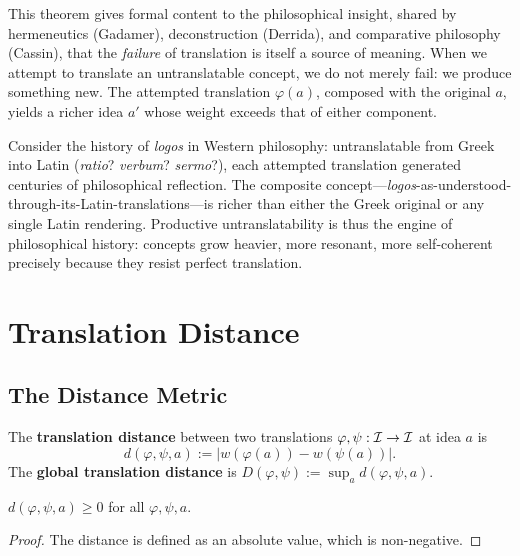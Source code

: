 \begin{interpretation}
\label{interp:generativity-failure}
This theorem gives formal content to the philosophical insight, shared by hermeneutics (Gadamer), deconstruction (Derrida), and comparative philosophy (Cassin), that the \emph{failure} of translation is itself a source of meaning.  When we attempt to translate an untranslatable concept, we do not merely fail: we produce something new.  The attempted translation $\varphi(a)$, composed with the original $a$, yields a richer idea $a'$ whose weight exceeds that of either component.

Consider the history of \emph{logos} in Western philosophy: untranslatable from Greek into Latin (\emph{ratio}? \emph{verbum}? \emph{sermo}?), each attempted translation generated centuries of philosophical reflection.  The composite concept---\emph{logos}-as-understood-through-its-Latin-translations---is richer than either the Greek original or any single Latin rendering.  Productive untranslatability is thus the engine of philosophical history: concepts grow heavier, more resonant, more self-coherent precisely because they resist perfect translation.
\end{interpretation}

\section{Translation Distance}
\label{sec:untranslatable:distance}

\subsection{The Distance Metric}

\begin{definition}
\label{def:translation-distance}
The \textbf{translation distance} between two translations
$\varphi, \psi : \mathcal{I} \to \mathcal{I}$ at idea $a$ is
\[
  d(\varphi, \psi, a)
    := |w(\varphi(a)) - w(\psi(a))|.
\]
The \textbf{global translation distance} is
$D(\varphi, \psi) := \sup_a d(\varphi, \psi, a)$.
\end{definition}

\begin{theorem}
\label{thm:dist-nonneg}
$d(\varphi, \psi, a) \geq 0$ for all $\varphi, \psi, a$.
\end{theorem}

\begin{proof}
The distance is defined as an absolute value, which is non-negative.
\end{proof}

